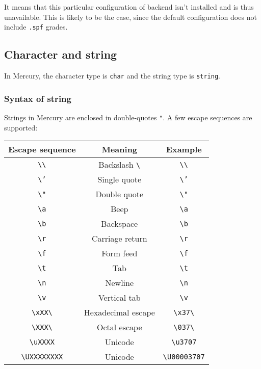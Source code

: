 It means that this particular configuration of backend isn't installed and is thus unavailable. This is likely to be the case, since the default configuration does not include \texttt{.spf} grades.

\subsection{Character and string}

In Mercury, the character type is \texttt{char} and the string type is \texttt{string}.


\subsubsection{Syntax of string}

Strings in Mercury are enclosed in double-quotes \texttt{"}. A few escape sequences are supported:


\begin{center}
  \begin{tabular}{|c|c|c|}
    \hline
    Escape sequence & Meaning & Example \\
    \hline
    \texttt{\textbackslash \textbackslash} & Backslash \texttt{\textbackslash} & \texttt{\textbackslash \textbackslash}\\
    \texttt{\textbackslash '} & Single quote & \texttt{\textbackslash '}\\
    \texttt{\textbackslash "} & Double quote & \texttt{\textbackslash "}\\
\texttt{\textbackslash a} & Beep & \texttt{\textbackslash a}\\
\texttt{\textbackslash b} & Backspace & \texttt{\textbackslash b}\\
\texttt{\textbackslash r} & Carriage return & \texttt{\textbackslash r}\\
\texttt{\textbackslash f} & Form feed & \texttt{\textbackslash f}\\
\texttt{\textbackslash t} & Tab & \texttt{\textbackslash t}\\
\texttt{\textbackslash n} & Newline & \texttt{\textbackslash n}\\
\texttt{\textbackslash v} & Vertical tab & \texttt{\textbackslash v}\\
    \texttt{\textbackslash xXX\textbackslash} & Hexadecimal escape & \texttt{\textbackslash x37\textbackslash}\\
    \texttt{\textbackslash XXX\textbackslash} & Octal escape & \texttt{\textbackslash 037\textbackslash}\\
\texttt{\textbackslash uXXXX} & Unicode & \texttt{\textbackslash u3707} \\
\texttt{\textbackslash UXXXXXXXX} & Unicode & \texttt{\textbackslash U00003707} \\
    \hline
  \end{tabular}
\end{center}

